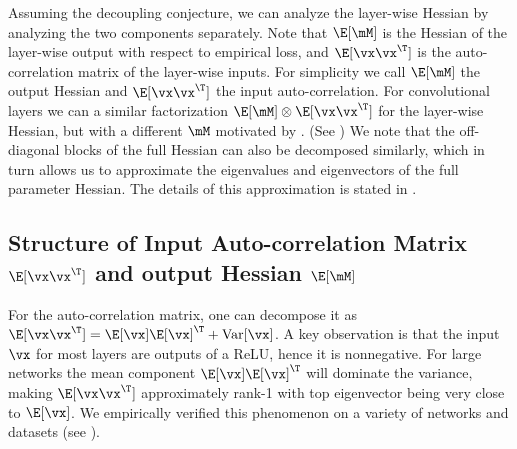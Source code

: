 
Assuming the decoupling conjecture, we can analyze the layer-wise Hessian by analyzing the two components separately. Note that $\E[\mM]$ is the Hessian of the layer-wise output with respect to empirical loss, and $\E[\vx\vx^\T]$ is the auto-correlation matrix of the layer-wise inputs. For simplicity we call $\E[\mM]$ the output Hessian and $\E[\vx\vx^\T]$ the input auto-correlation. For convolutional layers we can a similar factorization $\E[\mM]\otimes \E[\vx\vx^\T]$ for the layer-wise Hessian, but with a different $\mM$ motivated by \citet{grosse2016kronecker}. (See )
We note that the off-diagonal blocks of the full Hessian can also be decomposed similarly, which in turn allows %
us to approximate the eigenvalues and eigenvectors of the full parameter Hessian. The details of this approximation is stated in .

\subsection{Structure of Input Auto-correlation Matrix \texorpdfstring{$\E[\vx\vx^\T]$}{ExxT} and output Hessian \texorpdfstring{$\E[\mM]$}{M}}
\label{sec:xxT} 
For the  auto-correlation matrix, one can decompose it as $\E[\vx\vx^\T] = \E[\vx]\E[\vx]^\T + \mbox{Var}[\vx]$. A key observation is that the input $\vx$ for most layers are outputs of a ReLU, hence it is nonnegative. For large networks the mean component $\E[\vx]\E[\vx]^\T$ will dominate the variance, making $\E[\vx\vx^\T]$ approximately rank-1 with top eigenvector being very close to $\E[\vx]$. %
We empirically verified this phenomenon on a variety of networks and datasets (see ).

